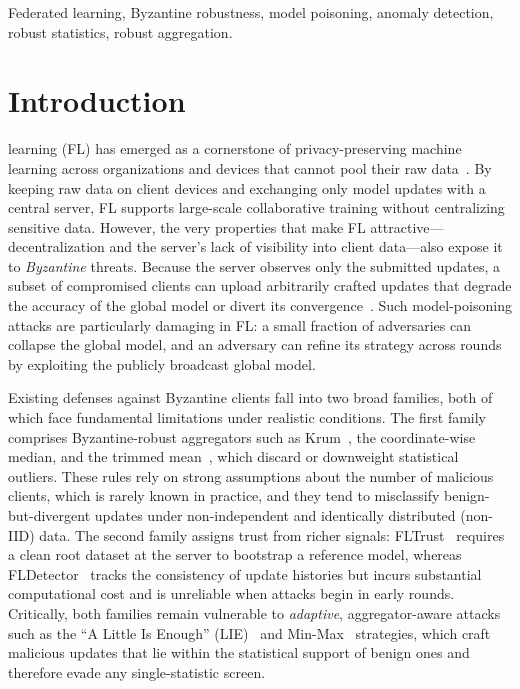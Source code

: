 \documentclass[journal]{IEEEtran}
\begin{document}
\begin{IEEEkeywords}
Federated learning, Byzantine robustness, model poisoning, anomaly detection, robust statistics, robust aggregation.
\end{IEEEkeywords}

\section{Introduction}
\label{sec:introduction}


 learning (FL) has emerged as a cornerstone of privacy-preserving machine learning across organizations and devices that cannot pool their raw data~\cite{sandeepa2025federated}. By keeping raw data on client devices and exchanging only model updates with a central server, FL supports large-scale collaborative training without centralizing sensitive data. However, the very properties that make FL attractive---decentralization and the server's lack of visibility into client data---also expose it to \emph{Byzantine} threats. Because the server observes only the submitted updates, a subset of compromised clients can upload arbitrarily crafted updates that degrade the accuracy of the global model or divert its convergence~\cite{baruch2019little, fang2020local, shejwalkar2021manipulating}. Such model-poisoning attacks are particularly damaging in FL: a small fraction of adversaries can collapse the global model, and an adversary can refine its strategy across rounds by exploiting the publicly broadcast global model.

Existing defenses against Byzantine clients fall into two broad families, both of which face fundamental limitations under realistic conditions. The first family comprises Byzantine-robust aggregators such as Krum~\cite{blanchard2017machine}, the coordinate-wise median, and the trimmed mean~\cite{yin2018byzantine}, which discard or downweight statistical outliers. These rules rely on strong assumptions about the number of malicious clients, which is rarely known in practice, and they tend to misclassify benign-but-divergent updates under non-independent and identically distributed (non-IID) data. The second family assigns trust from richer signals: FLTrust~\cite{cao2020fltrust} requires a clean root dataset at the server to bootstrap a reference model, whereas FLDetector~\cite{zhang2022fldetector} tracks the consistency of update histories but incurs substantial computational cost and is unreliable when attacks begin in early rounds. Critically, both families remain vulnerable to \emph{adaptive}, aggregator-aware attacks such as the ``A Little Is Enough'' (LIE)~\cite{baruch2019little} and Min-Max~\cite{shejwalkar2021manipulating} strategies, which craft malicious updates that lie within the statistical support of benign ones and therefore evade any single-statistic screen.
\end{document}
